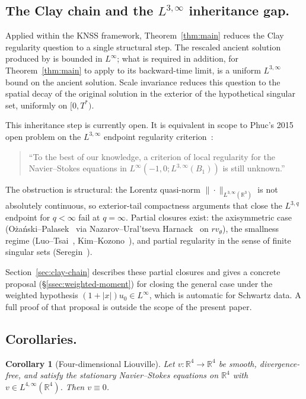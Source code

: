 \documentclass[11pt]{amsart}
\newtheorem{corollary}[theorem]{Corollary}
\theoremstyle{definition}
\newcommand{\RR}{\mathbb{R}}
\newcommand{\Lweak}[1]{L^{3,\infty}(\RR^{#1})}
\newcommand{\norm}[1]{\|#1\|}
\newcommand{\abs}[1]{|#1|}
\begin{document}
\subsection{The Clay chain and the $L^{3,\infty}$ inheritance gap.}
\label{ssec:clay-gap}
Applied within the KNSS framework, Theorem~\ref{thm:main} reduces
the Clay regularity question to a single structural step. The
rescaled ancient solution produced by \cite[\S6]{KNSS} is bounded
in $L^\infty$; what is required in addition, for
Theorem~\ref{thm:main} to apply to its backward-time limit, is a
uniform $L^{3,\infty}$ bound on the ancient solution. Scale
invariance reduces this question to the spatial decay of the
original solution in the exterior of the hypothetical singular
set, uniformly on $[0, T^*)$.

This inheritance step is currently open. It is equivalent in
scope to Phuc's 2015 open problem on the $L^{3,\infty}$ endpoint
regularity criterion~\cite[p.~4]{Phuc2015}:
\begin{quote}
``To the best of our knowledge, a criterion of local regularity
for the Navier--Stokes equations in $L^\infty(-1, 0;
L^{3,\infty}(B_1))$ is still unknown.''
\end{quote}
The obstruction is structural: the Lorentz quasi-norm
$\norm{\cdot}_{\Lweak{3}}$ is not absolutely continuous, so
exterior-tail compactness arguments that close the $L^{3,q}$
endpoint for $q < \infty$ fail at $q = \infty$. Partial closures
exist: the axisymmetric case (O\.{z}a\'nski--Palasek~\cite{OzanskiPalasek}
via Nazarov--Ural'tseva Harnack~\cite{NazarovUraltseva} on
$rv_\theta$), the smallness regime (Luo--Tsai~\cite{LuoTsai},
Kim--Kozono~\cite{KimKozono}), and partial regularity in the sense
of finite singular sets (Seregin~\cite{Seregin2019}).

Section~\ref{sec:clay-chain} describes these partial closures and
gives a concrete proposal (\S\ref{ssec:weighted-moment}) for
closing the general case under the weighted hypothesis
$(1 + \abs{x}) u_0 \in L^\infty$, which is automatic for Schwartz
data. A full proof of that proposal is outside the scope of the
present paper.

\subsection{Corollaries.}

\begin{corollary}[Four-dimensional Liouville]\label{cor:4d}
Let $v \colon \RR^4 \to \RR^4$ be smooth, divergence-free, and
satisfy the stationary Navier--Stokes equations on $\RR^4$ with
$v \in L^{4,\infty}(\RR^4)$. Then $v \equiv 0$.
\end{corollary}
\end{document}
